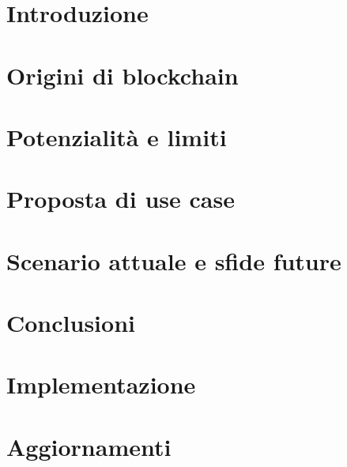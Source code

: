 \documentclass[12pt,twoside,openright]{report}
\begin{document}
\newpage

\tableofcontents
\listoffigures

\chapter{Introduzione}


\chapter{Origini di blockchain}\label{cap:origini}


\chapter{Potenzialità e limiti}\label{cap:analisiTecnologia}


\chapter{Proposta di use case}\label{cap:proposta}


\chapter{Scenario attuale e sfide future}\label{cap:scenario}


\chapter{Conclusioni}\label{cap:conclusioni}


\appendix

\chapter{Implementazione}


\chapter{Aggiornamenti}


{}

\end{document}
